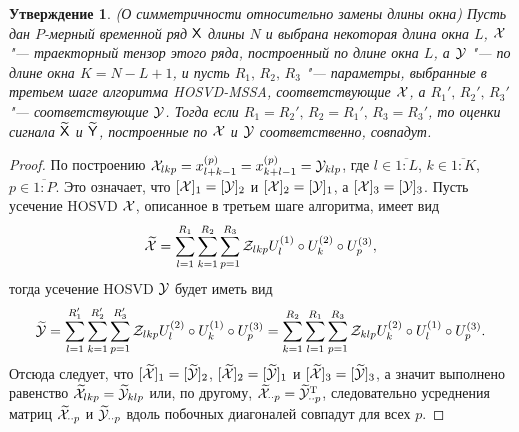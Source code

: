\documentclass[specialist,
    substylefile = spbu.rtx,
    subf,href,colorlinks=true, 12pt]{disser}
\theoremstyle{plain}
\newtheorem{statement}{Утверждение}[section]
\theoremstyle{definition}
\theoremstyle{remark}
\begin{document}
    \begin{statement}
        \emph{(О симметричности относительно замены длины окна)}
        Пусть дан $P$-мерный временной ряд $\mathsf{X}$ длины $N$ и выбрана некоторая длина окна $L$,
        $\mathcal{X}$ "--- траекторный тензор этого ряда, построенный по длине окна $L$, а
        $\mathcal{Y}$ "--- по длине окна ${K = N - L + 1}$, и пусть
        $R_1,\, R_2,\, R_3$ "--- параметры, выбранные в третьем шаге алгоритма \emph{HOSVD-MSSA}, соответствующие $\mathcal{X}$,
        а $R_1',\, R_2',\, R_3'$ "--- соответствующие $\mathcal{Y}$.
        Тогда если $R_1 = R_2',\, R_2 = R_1',\,  R_3 = R_3'$, то
        оценки сигнала $\widetilde{\mathsf{X}}$ и $\widetilde{\mathsf{Y}}$, построенные по $\mathcal{X}$ и $\mathcal{Y}$ соответственно,
        совпадут.
    \end{statement}
    \begin{proof}
        По построению $\mathcal{X}_{lkp} = x_{l+k-1}^{(p)} = x_{k+l-1}^{(p)} = \mathcal{Y}_{klp}$, где ${l\in \overline{1:L}}$,
        ${k \in \overline{1:K}}$, ${p\in \overline{1:P}}$.
        Это означает, что $[\mathcal{X}]_1 = [\mathcal{Y}]_2$ и $[\mathcal{X}]_2 = [\mathcal{Y}]_1$, а $[\mathcal{X}]_3 = [\mathcal{Y}]_3$.
        Пусть усечение HOSVD $\mathcal{X}$, описанное в третьем шаге алгоритма, имеет вид
        \[
            \widetilde{\mathcal{X}} = \sum_{l=1}^{R_1} \sum_{k=1}^{R_2} \sum_{p=1}^{R_3}
            \mathcal{Z}_{lkp} U_l^{(1)}\circ U_k^{(2)} \circ U_p^{(3)},
        \]
        тогда усечение HOSVD $\mathcal{Y}$ будет иметь вид
        \[
            \widetilde{\mathcal{Y}} = \sum_{l=1}^{R_1'} \sum_{k=1}^{R_2'} \sum_{p=1}^{R_3'}
            \mathcal{Z}_{lkp} U_l^{(2)}\circ U_k^{(1)} \circ U_p^{(3)}
            = \sum_{k=1}^{R_2} \sum_{l=1}^{R_1} \sum_{p=1}^{R_3}
            \mathcal{Z}_{klp} U_k^{(2)}\circ U_l^{(1)} \circ U_p^{(3)}.
        \]
        Отсюда следует, что $[\widetilde{\mathcal{X}}]_1 = [\widetilde{\mathcal{Y}}]_2$, 
        $[\widetilde{\mathcal{X}}]_2 = [\widetilde{\mathcal{Y}}]_1$ и
        $[\widetilde{\mathcal{X}}]_3 = [\widetilde{\mathcal{Y}}]_3$, а значит выполнено равенство
        $\widetilde{\mathcal{X}}_{lkp}=\widetilde{\mathcal{Y}}_{klp}$ или, по другому, $\widetilde{\mathcal{X}}_{\cdot \cdot p} = \widetilde{\mathcal{Y}}_{\cdot \cdot p}^{\mathrm{T}}$,
        следовательно усреднения матриц $\widetilde{\mathcal{X}}_{\cdot \cdot p}$ и $\widetilde{\mathcal{Y}}_{\cdot \cdot p}$ вдоль побочных диагоналей совпадут
        для всех $p$.
    \end{proof}
\end{document}
